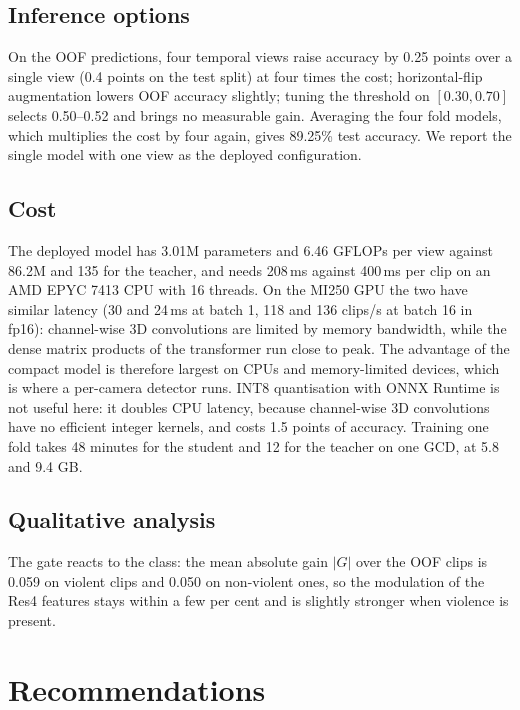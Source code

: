 \documentclass[conference]{IEEEtran}
\begin{document}
\subsection{Inference options}
\label{sec:options}

On the OOF predictions, four temporal views raise accuracy by 0.25 points
over a single view (0.4 points on the test split) at four times the cost;
horizontal-flip augmentation lowers OOF accuracy slightly; tuning the
threshold on $[0.30, 0.70]$ selects 0.50--0.52 and brings no measurable
gain. Averaging the four fold models, which multiplies the cost by four
again, gives 89.25\% test accuracy. We report the single model with one
view as the deployed configuration.

\subsection{Cost}

The deployed model has 3.01M parameters and 6.46 GFLOPs per view against
86.2M and 135 for the teacher, and needs 208\,ms against 400\,ms per clip
on an AMD EPYC 7413 CPU with 16 threads. On the MI250 GPU the two have
similar latency (30 and 24\,ms at batch 1, 118 and 136 clips/s at batch 16
in fp16):
channel-wise 3D convolutions are limited by memory bandwidth, while the
dense matrix products of the transformer run close to peak. The advantage of the compact model is therefore largest on CPUs and
memory-limited devices, which is where a per-camera detector runs. INT8
quantisation with ONNX Runtime is not useful here: it doubles CPU latency,
because channel-wise 3D convolutions have no efficient integer kernels,
and costs 1.5 points of accuracy. Training one fold takes 48 minutes for
the student and 12 for the teacher on one GCD, at 5.8 and 9.4 GB.


\subsection{Qualitative analysis}

The gate reacts to the class: the mean absolute gain $|G|$ over the OOF
clips is 0.059 on violent clips and 0.050 on non-violent ones, so the
modulation of the Res4 features stays within a few per cent and is
slightly stronger when violence is present.

\section{Recommendations}
\end{document}
